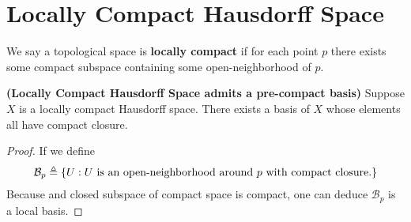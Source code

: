 \documentclass{report}
\begin{document}
\section{Locally Compact Hausdorff Space}
\begin{abstract}

\end{abstract}
\begin{mdframed}
We say a topological space is \textbf{locally compact} if for each point $p$ there exists some compact subspace containing some open-neighborhood of $p$.  
\end{mdframed}
\begin{theorem}
\label{Locally Compact Hausdorff Space admits a pre-compact basis}
\textbf{(Locally Compact Hausdorff Space admits a pre-compact basis)} Suppose $X$ is a locally compact Hausdorff space. There exists a basis of $X$ whose elements all have compact closure. 
\end{theorem}
\begin{proof}
If we define 
\begin{align*}
\mathcal{B}_p\triangleq \{ U:U\text{ is an open-neighborhood around $p$ with compact closure.} \}
\end{align*}
Because  and closed subspace of compact space is compact, one can deduce $\mathcal{B}_p$ is a local basis.  
\end{proof}
\end{document}
